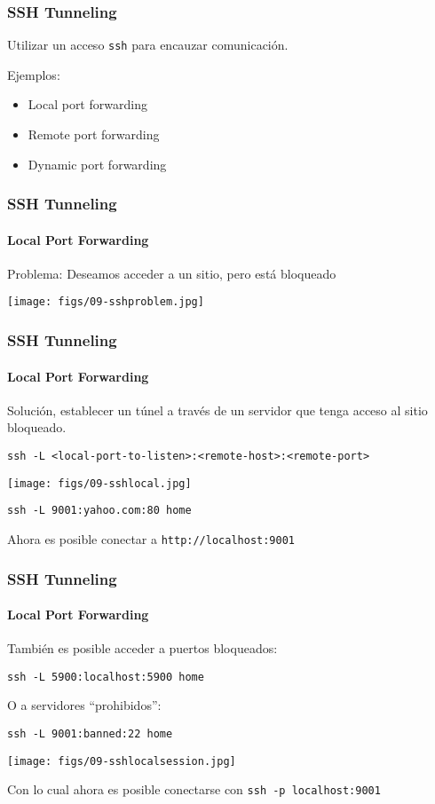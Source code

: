 \documentclass[letter]{beamer}
\begin{document}
\begin{frame}
  \frametitle{SSH Tunneling}

  Utilizar un acceso {\tt ssh} para encauzar comunicación.

  Ejemplos:
  \begin{itemize}
    \item Local port forwarding
    \item Remote port forwarding
    \item Dynamic port forwarding
  \end{itemize}

\end{frame}
\begin{frame}
  \frametitle{SSH Tunneling}
  \framesubtitle{Local Port Forwarding}

  Problema: Deseamos acceder a un sitio, pero está bloqueado

  \begin{center}
    \texttt{[image: figs/09-sshproblem.jpg]}
  \end{center}


\end{frame}
\begin{frame}
  \frametitle{SSH Tunneling}
  \framesubtitle{Local Port Forwarding}

  Solución, establecer un túnel a través de un servidor que tenga acceso al sitio bloqueado.
  
  \begin{center}
    {\tt ssh -L <local-port-to-listen>:<remote-host>:<remote-port>}
   
    \texttt{[image: figs/09-sshlocal.jpg]}
    
    {\tt ssh -L 9001:yahoo.com:80 home}
  \end{center}
   
   Ahora es posible conectar a {\tt http://localhost:9001}
\end{frame}
\begin{frame}
  \frametitle{SSH Tunneling}
  \framesubtitle{Local Port Forwarding}

  También es posible acceder a puertos bloqueados:
  \begin{center}
    {\tt ssh -L 5900:localhost:5900 home}
  \end{center}
  
  O a servidores ``prohibidos'':
  
  \begin{center}
    {\tt ssh -L 9001:banned:22 home}
   
    \texttt{[image: figs/09-sshlocalsession.jpg]}
    
  \end{center}
   
   Con lo cual ahora es posible conectarse con {\tt ssh -p localhost:9001}
\end{frame}
\end{document}
